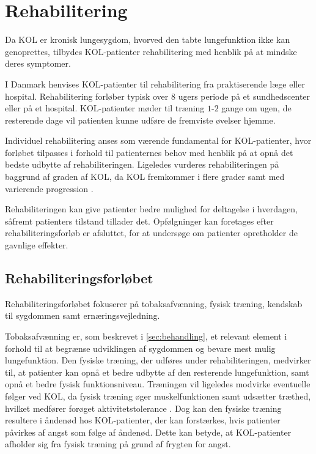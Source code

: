 \section{Rehabilitering}
Da KOL er kronisk lungesygdom, hvorved den tabte lungefunktion ikke kan genoprettes, tilbydes KOL-patienter rehabilitering med henblik på at mindske deres symptomer. 

I Danmark henvises KOL-patienter til rehabilitering fra praktiserende læge eller hospital. Rehabilitering forløber typisk over $8$ ugers periode på et sundhedscenter eller på et hospital. KOL-patienter møder til træning $1$-$2$ gange om ugen, de resterende dage vil patienten kunne udføre de fremviste øvelser hjemme. \cite{McCarthy2015,Frausing2011b} 

Individuel rehabilitering anses som værende fundamental for KOL-patienter, hvor forløbet tilpasses i forhold til patienternes behov med henblik på at opnå det bedste udbytte af rehabiliteringen. \cite{McCarthy2015,Habraken2011,Sundhedsstyrelsen2015} Ligeledes vurderes rehabiliteringen på baggrund af graden af KOL, da KOL fremkommer i flere grader samt med varierende progression \cite{McCarthy2015}. 

Rehabiliteringen kan give patienter bedre mulighed for deltagelse i hverdagen, såfremt patienters tilstand tillader det. \cite{McCarthy2015,Habraken2011, Sundhedsstyrelsen2015} Opfølgninger kan foretages efter rehabiliteringsforløb er afsluttet, for at undersøge om patienter opretholder de gavnlige effekter. \cite{Frausing2011b}


\subsection{Rehabiliteringsforløbet}
Rehabiliteringsforløbet fokuserer på tobaksafvænning, fysisk træning, kendskab til sygdommen samt ernæringsvejledning. \cite{McCarthy2015,Habraken2011,Sundhedsstyrelsen2015} 

Tobaksafvænning er, som beskrevet i \autoref{sec:behandling}, et relevant element i forhold til at begrænse udviklingen af sygdommen og bevare mest mulig lungefunktion. Den fysiske træning, der udføres under rehabiliteringen, medvirker til, at patienter kan opnå et bedre udbytte af den resterende lungefunktion, samt opnå et bedre fysisk funktionsniveau. \cite{Sundhedsstyrelsen2015}
Træningen vil ligeledes modvirke eventuelle følger ved KOL, da fysisk træning øger muskelfunktionen samt udsætter træthed, hvilket medfører forøget aktivitetstolerance \cite{McCarthy2015}. Dog kan den fysiske træning resultere i åndenød hos KOL-patienter, der kan forstærkes, hvis patienter påvirkes af angst som følge af åndenød. Dette kan betyde, at KOL-patienter afholder sig fra fysisk træning på grund af frygten for angst. \cite{McCarthy2015, Sundhedsstyrelsen2015} 

